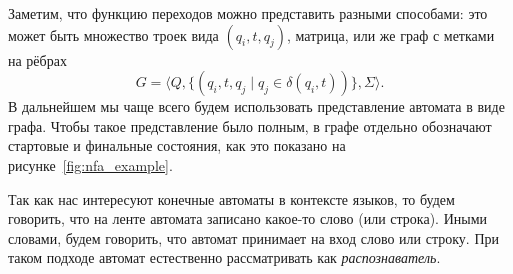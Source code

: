 Заметим, что функцию переходов можно представить разными способами: это может быть множество троек вида $(q_i, t, q_j)$, матрица, или же граф с метками на рёбрах
\[G = \langle Q, \{(q_i,t,q_j \mid q_j \in \delta(q_i,t))\}, \Sigma \rangle.\]
В дальнейшем мы чаще всего будем использовать представление автомата в виде графа.
Чтобы такое представление было полным, в графе отдельно обозначают стартовые и финальные состояния, как это показано на рисунке~\ref{fig:nfa_example}.

Так как нас интересуют конечные автоматы в контексте языков, то будем говорить, что на ленте автомата записано какое-то слово (или строка).
Иными словами, будем говорить, что автомат принимает на вход слово или строку.
При таком подходе автомат естественно рассматривать как \emph{распознаватель}.

